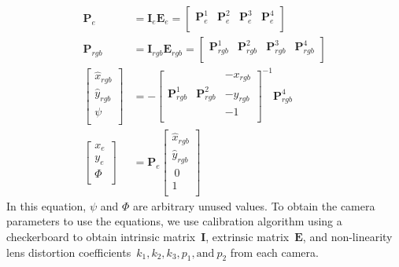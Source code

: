 \begin{equation}
\begin{aligned}
\textbf{P}_{e}&=\textbf{I}_{e}\textbf{E}_{e}=\begin{bmatrix}
 \textbf{P}^{1}_{e} & \textbf{P}^{2}_{e} & \textbf{P}^{3}_{e} & \textbf{P}^{4}_{e}  \\
\end{bmatrix} \\
\textbf{P}_{rgb}&=\textbf{I}_{rgb}\textbf{E}_{rgb}=\begin{bmatrix}
 \textbf{P}^{1}_{rgb} & \textbf{P}^{2}_{rgb} & \textbf{P}^{3}_{rgb} & \textbf{P}^{4}_{rgb}  \\
\end{bmatrix} \\
\begin{bmatrix}
 \hat{x}_{rgb} \\ \hat{y}_{rgb} \\ \psi  \\
\end{bmatrix}&=-\begin{bmatrix}
  &  & -x_{rgb}  \\
 \textbf{P}^{1}_{rgb} & \textbf{P}^{2}_{rgb} & -y_{rgb}  \\
  &  &  -1  \\
\end{bmatrix}^{-1} \textbf{P}^{4}_{rgb} \\
\begin{bmatrix}
 x_{e} \\ y_{e} \\ \Phi \\
\end{bmatrix}
&=\textbf{P}_{e}\begin{bmatrix}
 \hat{x}_{rgb} \\ \hat{y}_{rgb} \\ \ 0 \\ 1 \\
\end{bmatrix}
\end{aligned}
\label{input:planetransform}
\end{equation}
In this equation, $\psi$ and $\Phi$ are arbitrary unused values. To obtain the camera parameters to use the equations, we use \citep{zhang2000flexible} calibration algorithm using a checkerboard to obtain intrinsic matrix~$\textbf{I}$, extrinsic matrix~$\textbf{E}$, and non-linearity lens distortion coefficients~$k_{1}, k_{2}, k_{3}, p_{1}, \text{and}~p_{2}$ from each camera.